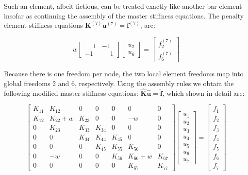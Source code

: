 \documentclass[10pt,b5paper,titlepage]{book}
\begin{document}
Such an element, albeit fictious, can be treated exactly like another bar element
insofar as continuing the assembly of the master stiffness equations. The penalty
element stiffness equations $ \mathbf{K}^{(7)} \mathbf{u}^{(7)} = \mathbf{f}^{(7)} $,
are:

\begin{equation}
    w \begin{bmatrix}
        \phantom{-}1 & -1 \\
        -1 & \phantom{-}1
    \end{bmatrix}
    \begin{bmatrix}
        u_2 \\
        u_6
    \end{bmatrix}
    = \begin{bmatrix}
        f_2^{(7)} \\
        f_6^{(7)}
    \end{bmatrix}
\end{equation}

Because there is one freedom per node, the two local element freedoms map into global
freedoms 2 and 6, respectively. Using the assembly rules we obtain the following
modified master stiffness equations: $ \mathbf{\hat{K}} \mathbf{\hat{u}} = \mathbf{\hat{f}} $,
which shown in detail are:

\begin{equation}\label{mfc-penalty-master-stiffnes}
    \begin{bmatrix}
        K_{11} & K_{12} & 0 & 0 & 0 & 0 & 0 \\
        K_{12} & K_{22} + w & K_{23} & 0 & 0 & -w & 0 \\
        0 & K_{23} & K_{33} & K_{34} & 0 & 0 & 0 \\
        0 & 0 & K_{34} & K_{44} & K_{45} & 0 & 0 \\
        0 & 0 & 0 & K_{45} & K_{55} & K_{56} & 0 \\
        0 & -w & 0 & 0 & K_{56} & K_{66} + w & K_{67} \\
        0 & 0 & 0 & 0 & 0 & K_{67} & K_{77}
    \end{bmatrix}
    \begin{bmatrix}
        u_1 \\
        u_2 \\
        u_3 \\
        u_4 \\
        u_5 \\
        u_6 \\
        u_7
    \end{bmatrix}
    = \begin{bmatrix}
        f_1 \\
        f_2 \\
        f_3 \\
        f_4 \\
        f_5 \\
        f_6 \\
        f_7
    \end{bmatrix}
\end{equation}
\end{document}
